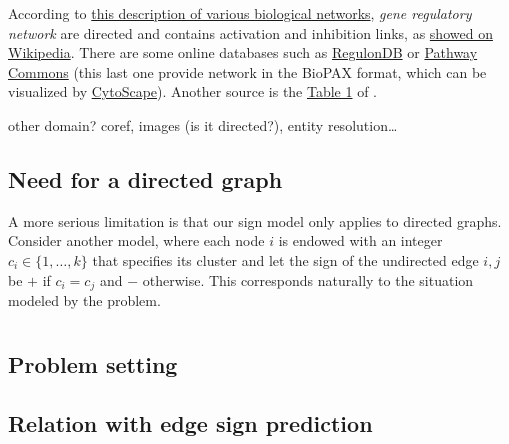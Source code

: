 \documentclass[nobib, a4paper, 10pt, oneside, onecolumn, openany, notitlepage, final,
svgnames, marginals=raggedouter, english,
]{article}
\begin{document}
According to \href{https://web.stanford.edu/class/cs224w/slides/handout-bionets.pdf}%
{this description of various biological networks}, \emph{gene regulatory network} are directed and
contains activation and inhibition links, as \href{https://en.wikipedia.org/wiki/Gene_regulatory_network#Overview}%
{showed on Wikipedia}. There are some online databases such as
\href{http://regulondb.ccg.unam.mx/menu/download/datasets/index.jsp}%
{RegulonDB} or \href{http://www.pathwaycommons.org/pcviz/}{Pathway Commons} (this last one provide
network in the BioPAX format, which can be visualized by
\href{http://www.cytoscape.org/}{CytoScape}).
Another source is the \href{https://www.ncbi.nlm.nih.gov/pmc/articles/PMC2708159/table/T1}{Table 1}
of \cite{BioSigned09}.

other domain? coref, images (is it directed?), entity resolution…

\subsection{Need for a directed graph}
\label{sub:need_for_a_directed_graph}


A more serious limitation is that our sign model only applies to directed graphs. Consider
another model, where each node $i$ is endowed with an integer $c_i \in \{1, \ldots, k\}$ that
specifies its cluster and let the sign of the undirected edge $i,j$ be $+$ if $c_i = c_j$ and $-$
otherwise.  This corresponds naturally to the situation modeled by the \pcc{} problem.

\section{\pcc{}}
\label{sec:correlation_clustering}

\subsection{Problem setting}
\label{sub:problem_setting}

\subsection{Relation with edge sign prediction}
\label{sub:relation_with_edge_sign_prediction}
\end{document}
